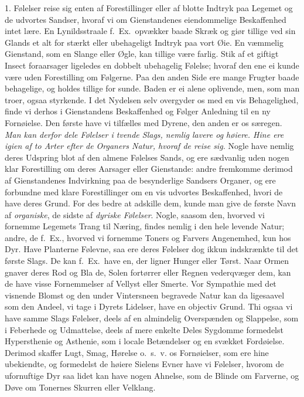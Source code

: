 \documentclass[12pt,a4paper]{article}
\newcommand{\opage}[1]{\marginnote{\footnotesize\textit{[#1]}}}
\begin{document}
1. Følelser reise sig enten af Forestillinger eller af blotte Indtryk paa Legemet og de
udvortes Sandser, hvoraf vi om Gienstandenes eiendommelige Beskaffenhed intet lære. En
Lynildsstraale f.~Ex.\ opvækker baade Skræk og giør tillige ved sin Glands et alt for
stærkt eller ubehageligt Indtryk paa vort Øie. En væmmelig Gienstand, som en Slange eller
Øgle, kan tillige være farlig. Stik af et giftigt Insect foraarsager ligeledes en dobbelt
ubehagelig Følelse; hvoraf den ene ei kunde
\opage{228} være uden Forestilling om Følgerne. Paa den anden Side ere mange Frugter baade
behagelige, og holdes tillige for sunde. Baden er ei alene oplivende, men, som man troer,
ogsaa styrkende. I det Nydelsen selv overgyder os med en vis Behagelighed, finde vi derhos
i Gienstandens Beskaffenhed og Følger Anledning til en ny Fornøielse. Den første have vi
tilfælles med Dyrene, den anden er os særegen. \emph{Man kan derfor dele Følelser i tvende
Slags, nemlig lavere og høiere. Hine ere igien af to Arter efter de Organers Natur, hvoraf
de reise sig.} Nogle have nemlig deres Udspring blot af den almene Følelses Sands, og ere
sædvanlig uden nogen klar Forestilling om deres Aarsager eller Gienstande: andre fremkomme
derimod af Gienstandenes Indvirkning paa de besynderlige Sandsers Organer, og ere forbundne
med klare Forestillinger om en vis udvortes Beskaffenhed, hvori de have deres Grund. For
des bedre at adskille dem, kunde man give de første Navn af \emph{organiske}, de sidste af
\emph{dyriske Følelser}. Nogle, saasom den, hvorved vi fornemme Legemets Trang til Næring,
findes nemlig i den hele levende Natur; andre, de f.~Ex., hvorved vi fornemme Toners og
Farvers Angenemhed, kun hos Dyr. Have Planterne Følevne, saa ere deres Følelser dog ikkun
indskrænkte til det første Slags. De kan f.~Ex.\ have en, der ligner Hunger eller Tørst.
Naar Ormen gnaver deres Rod og Bla%
\opage{229}de, Solen fortørrer eller Regnen vederqvæger dem, kan de have visse Fornemmelser af Vellyst
eller Smerte. Vor Sympathie med det visnende Blomst og den under Vintersneen begravede
Natur kan da ligesaavel som den Andeel, vi tage i Dyrets Lidelser, have en objectiv Grund.
Thi ogsaa vi have samme Slags Følelser, deels af en almindelig Overspænden og Slappelse,
som i Feberhede og Udmattelse, deels af mere enkelte Deles Sygdomme formedelst Hypersthenie
og Asthenie, som i locale Betændelser og en svækket Fordøielse. Derimod skaffer Lugt,
Smag, Hørelse o.~s.~v. os Fornøielser, som ere hine ubekiendte, og formedelst de høiere
Sielens Evner have vi Følelser, hvorom de ufornuftige Dyr saa lidet kan have nogen Ahnelse,
som de Blinde om Farverne, og Døve om Tonernes Skurren eller Velklang.
\end{document}
